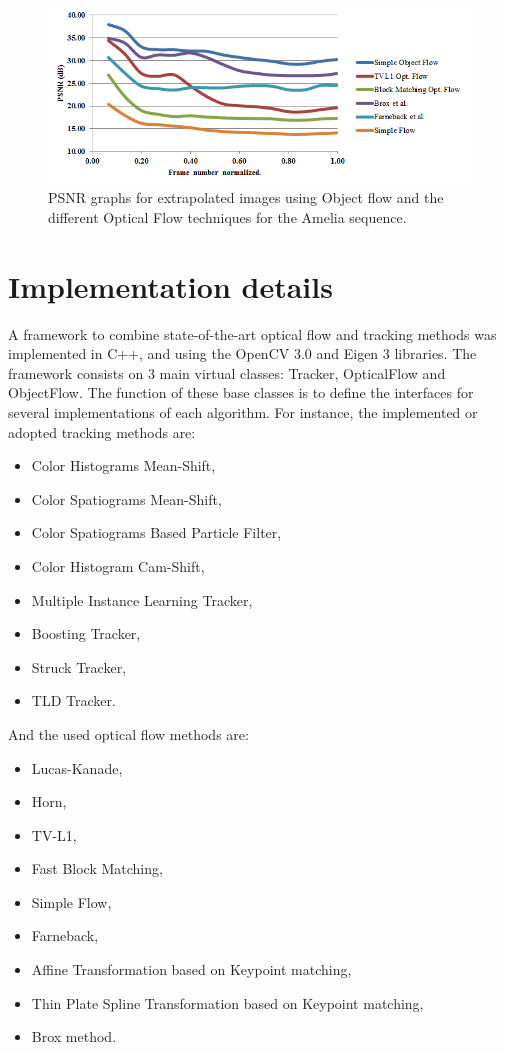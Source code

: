    \begin{figure}[th]
      \centering
      \includegraphics[width=1.0\textwidth]{../images/psnr2.png}
      \caption{PSNR graphs for extrapolated images using Object flow and the different Optical Flow techniques for the Amelia sequence. }
      \label{of_res2}
   \end{figure}
	\setlength{\belowcaptionskip}{-10pt}

\section{Implementation details}

A framework to combine state-of-the-art optical flow and tracking methods was implemented in C++, and using the OpenCV 3.0 and Eigen 3 libraries. 
The framework consists on 3 main virtual classes: Tracker, 
OpticalFlow and ObjectFlow. The function of these base classes is to define the interfaces for several implementations of each algorithm. For instance, 
the implemented or adopted tracking methods are:

\begin{itemize}
  \item Color Histograms Mean-Shift,
  \item Color Spatiograms Mean-Shift,
  \item Color Spatiograms Based Particle Filter,
  \item Color Histogram Cam-Shift,
  \item Multiple Instance Learning Tracker,
  \item Boosting Tracker,
  \item Struck Tracker,
  \item TLD Tracker.
\end{itemize}

And the used optical flow methods are:

\begin{itemize}
  \item Lucas-Kanade,
  \item Horn,
  \item TV-L1,
  \item Fast Block Matching, 
  \item Simple Flow,
  \item Farneback,
  \item Affine Transformation based on Keypoint matching,
  \item Thin Plate Spline Transformation based on Keypoint matching,
  \item Brox method.
\end{itemize}

